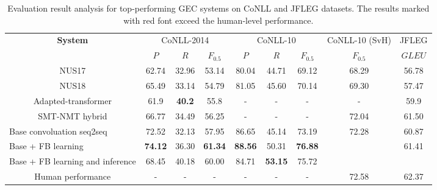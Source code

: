 \documentclass{article} %
\begin{document}
\begin{table}[t]
\small
\scalebox{0.9}
{
\begin{tabular}{c|ccc|ccc|c|c}
\hline
\multirow{2}{*}{\bf System}                              & \multicolumn{3}{c|}{CoNLL-2014}                   & \multicolumn{3}{c|}{CoNLL-10}                     & CoNLL-10 (SvH) & JFLEG          \\ 
                                                     & $P$              & $R$              & $F_{0.5}$              & $P$              & $R$              & $F_{0.5}$              & $F_{0.5}$              & $GLEU$           \\ \hline
NUS17                                                & 62.74          & 32.96          & 53.14          & 80.04              & 44.71              & 69.12          & 68.29          & 56.78          \\
NUS18                                                & 65.49          & 33.14          & 54.79          & 81.05              & 45.60              & 70.14              & 69.30              & 57.47          \\
Adapted-transformer &  61.9 & \bf 40.2 & 55.8 & - & - & - & - & 59.9 \\
SMT-NMT hybrid                                       & 66.77          & 34.49          & 56.25          & -              & -              & -          & 72.04             & 61.50          \\ \hline
\multicolumn{1}{l|}{Base convoluation seq2seq}        & 72.52          & 32.13          & 57.95          & 86.65          & 45.14          & 73.19          & 72.28          & 60.87          \\
\multicolumn{1}{l|}{Base + FB learning}               & \textbf{74.12} & 36.30          & \textbf{61.34} & \textbf{88.56} & 50.31          & \textbf{76.88} & \color{red}{\textbf{75.93}} & 61.41          \\
\multicolumn{1}{l|}{Base + FB learning and inference} & 68.45          & 40.18 & 60.00          & 84.71          & \textbf{53.15} & 75.72          & \color{red}{74.84}          & \color{red}{\textbf{62.42}} \\ \hline
Human performance                                    & -              & -              & -              & -              & -              & -              & 72.58          & 62.37         \\ \hline 
\end{tabular}
}
\caption{Evaluation result analysis for top-performing GEC systems on CoNLL and JFLEG datasets. The results marked with red font exceed the human-level performance.}
\label{tab:result_analysis}
\end{table}
\end{document}
